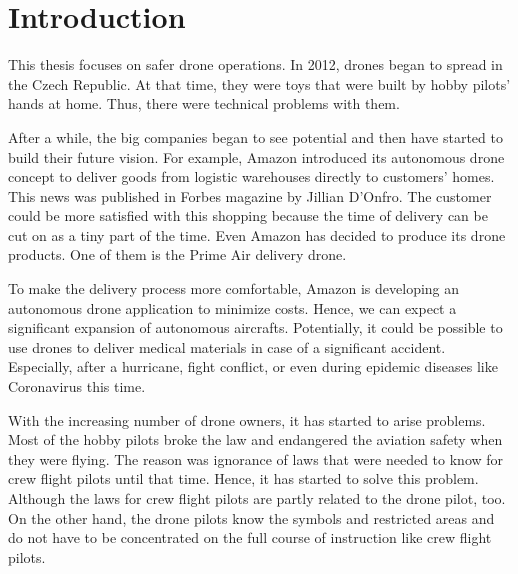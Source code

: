 \chapter{Introduction}\label{ch:introduction}
This thesis focuses on safer drone operations.%
In 2012, drones began to spread in the Czech Republic.
At that time, they were toys that were built by hobby pilots' hands at home.%
Thus, there were technical problems with them.%

After a while, the big companies began to see potential and then have started to build their future vision. %
For example, Amazon introduced its autonomous drone concept to deliver goods from logistic warehouses directly to customers’ homes. %
This news was published in Forbes magazine by Jillian D'Onfro.\cite{amazonArticle}
The customer could be more satisfied with this shopping because the time of delivery can be cut on as a tiny part of the time.
Even Amazon has decided to produce its drone products.
One of them is the Prime Air delivery drone.

To make the delivery process more comfortable, Amazon is developing an autonomous drone application to minimize costs.
Hence, we can expect a significant expansion of autonomous aircrafts.
Potentially, it could be possible to use drones to deliver medical materials in case of a significant accident.
Especially, after a hurricane, fight conflict, or even during epidemic diseases like Coronavirus this time.

With the increasing number of drone owners, it has started to arise problems. %
Most of the hobby pilots broke the law and endangered the aviation safety when they were flying. %
The reason was ignorance of laws that were needed to know for crew flight pilots until that time. %
Hence, it has started to solve this problem. %
Although the laws for crew flight pilots are partly related to the drone pilot, too. %
On the other hand, the drone pilots know the symbols and restricted areas and do not have to be concentrated on the full course of instruction like crew flight pilots.

